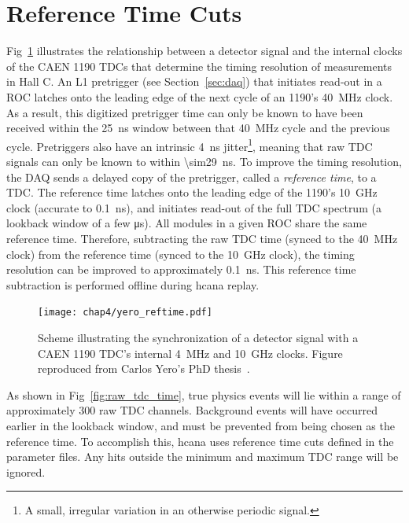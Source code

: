 \section{Reference Time Cuts} \label{sec:reftime}

Fig~\ref{fig:reference_time_cartoon} illustrates the relationship
between a detector signal and the internal clocks of the CAEN 1190 TDCs that
determine the timing resolution of measurements in Hall C.
An L1 pretrigger (see Section~\ref{sec:daq}) that initiates read-out
in a ROC latches onto the leading edge of the next cycle of an 1190's
\SI{40}{\mega\hertz} clock.
As a result, this digitized pretrigger time can only be known to have been
received within the \SI{25}{\nano\second} window between that
\SI{40}{\mega\hertz} cycle and the previous cycle.
Pretriggers also have an intrinsic \SI{4}{\nano\second}
jitter\footnote{A small, irregular variation in an otherwise periodic signal.},
meaning that raw TDC signals can only be known to within
\SI{\sim29}{\nano\second}.
To improve the timing resolution, the DAQ sends a delayed copy of the
pretrigger, called a \textit{reference time}, to a TDC.
The reference time latches onto the leading edge of the 1190's
\SI{10}{\giga\hertz} clock (accurate to \SI{0.1}{\nano\second}), and initiates
read-out of the full TDC spectrum (a lookback window of a few
\si{\micro\second}).
All modules in a given ROC share the same reference time.
Therefore, subtracting the raw TDC time (synced to the \SI{40}{\mega\hertz}
clock) from the reference time (synced to the \SI{10}{\giga\hertz} clock),
the timing resolution can be improved to approximately \SI{0.1}{\nano\second}.
This reference time subtraction is performed offline during hcana
replay.


\begin{figure}[!h]
    \centering
    \texttt{[image: chap4/yero\_reftime.pdf]}
    \caption[Scheme illustrating the synchronization of a detector signal
            with a CAEN 1190 TDC's internal \SI{4}{\mega\hertz} and
            \SI{10}{\giga\hertz} clocks.]{
            Scheme illustrating the synchronization of a detector signal
            with a CAEN 1190 TDC's internal \SI{4}{\mega\hertz} and
            \SI{10}{\giga\hertz} clocks. Figure reproduced from Carlos Yero's
            PhD thesis~\cite{Yero_2020}.
            }
    \label{fig:reference_time_cartoon}
\end{figure}


As shown in Fig~\ref{fig:raw_tdc_time},
true physics events will lie within a range of approximately 300 raw TDC
channels.
Background events will have occurred earlier in the lookback window, and must
be prevented from being chosen as the reference time.
To accomplish this, hcana uses reference time cuts defined in
the parameter files.
Any hits outside the minimum and maximum TDC range will be ignored.

